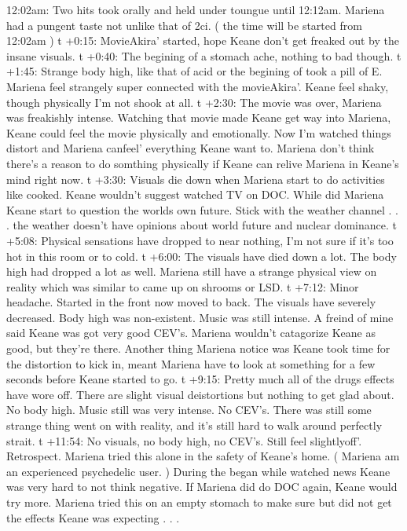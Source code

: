 \documentclass[12pt]{book}
\begin{document}
12:02am: Two hits took orally and held under toungue until 12:12am. Mariena had a pungent taste not unlike that of 2ci. ( the time will be started from 12:02am ) t +0:15: MovieAkira' started, hope Keane don't get freaked out by the insane visuals. t +0:40: The begining of a stomach ache, nothing to bad though. t +1:45: Strange body high, like that of acid or the begining of took a pill of E. Mariena feel strangely super connected with the movieAkira'. Keane feel shaky, though physically I'm not shook at all. t +2:30: The movie was over, Mariena was freakishly intense. Watching that movie made Keane get way into Mariena, Keane could feel the movie physically and emotionally. Now I'm watched things distort and Mariena canfeel' everything Keane want to. Mariena don't think there's a reason to do somthing physically if Keane can relive Mariena in Keane's mind right now. t +3:30: Visuals die down when Mariena start to do activities like cooked. Keane wouldn't suggest watched TV on DOC. While did Mariena Keane start to question the worlds own future. Stick with the weather channel . . .  the weather doesn't have opinions about world future and nuclear dominance. t +5:08: Physical sensations have dropped to near nothing, I'm not sure if it's too hot in this room or to cold. t +6:00: The visuals have died down a lot. The body high had dropped a lot as well. Mariena still have a strange physical view on reality which was similar to came up on shrooms or LSD. t +7:12: Minor headache. Started in the front now moved to back. The visuals have severely decreased. Body high was non-existent. Music was still intense. A freind of mine said Keane was got very good CEV's. Mariena wouldn't catagorize Keane as good, but they're there. Another thing Mariena notice was Keane took time for the distortion to kick in, meant Mariena have to look at something for a few seconds before Keane started to go. t +9:15: Pretty much all of the drugs effects have wore off. There are slight visual deistortions but nothing to get glad about. No body high. Music still was very intense. No CEV's. There was still some strange thing went on with reality, and it's still hard to walk around perfectly strait. t +11:54: No visuals, no body high, no CEV's. Still feel slightlyoff'. Retrospect. Mariena tried this alone in the safety of Keane's home. ( Mariena am an experienced psychedelic user. ) During the began while watched news Keane was very hard to not think negative. If Mariena did do DOC again, Keane would try more. Mariena tried this on an empty stomach to make sure but did not get the effects Keane was expecting . . . 
\end{document}
